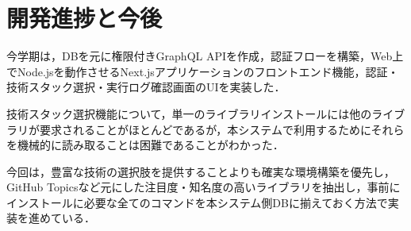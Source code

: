 \documentclass[main]{subfiles}
\begin{document}
\section{開発進捗と今後}
 今学期は，DBを元に権限付きGraphQL APIを作成，認証フローを構築，Web上でNode.jsを動作させるNext.jsアプリケーションのフロントエンド機能，認証・技術スタック選択・実行ログ確認画面のUIを実装した．

 技術スタック選択機能について，単一のライブラリインストールには他のライブラリが要求されることがほとんどであるが，本システムで利用するためにそれらを機械的に読み取ることは困難であることがわかった．

 今回は，豊富な技術の選択肢を提供することよりも確実な環境構築を優先し，GitHub Topicsなど元にした注目度・知名度の高いライブラリを抽出し，事前にインストールに必要な全てのコマンドを本システム側DBに揃えておく方法で実装を進めている．
\end{document}
